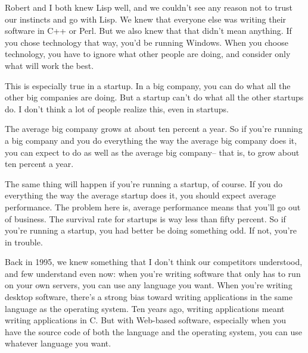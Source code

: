 Robert and I both
                  knew Lisp well, and we couldn't see any reason not to trust
                  our instincts and go with Lisp. We knew that everyone else was
                  writing their software in C++ or Perl. But we also knew that
                  that didn't mean anything. If you chose technology that way,
                  you'd be running Windows. When you choose technology, you have
                  to ignore what other people are doing, and consider only what
                  will work the best.

This is especially true in a
                  startup. In a big company, you can do what all the other big
                  companies are doing. But a startup can't do what all the other
                  startups do. I don't think a lot of people realize this, even
                  in startups.

The average big company grows at about
                  ten percent a year. So if you're running a big company and you
                  do everything the way the average big company does it, you can
                  expect to do as well as the average big company-- that is, to
                  grow about ten percent a year.

The same thing will
                  happen if you're running a startup, of course. If you do
                  everything the way the average startup does it, you should
                  expect average performance. The problem here is, average
                  performance means that you'll go out of business. The survival
                  rate for startups is way less than fifty percent. So if you're
                  running a startup, you had better be doing something odd. If
                  not, you're in trouble.

Back in 1995, we knew
                  something that I don't think our competitors understood, and
                  few understand even now: when you're writing software that
                  only has to run on your own servers, you can use any language
                  you want. When you're writing desktop software, there's a
                  strong bias toward writing applications in the same language
                  as the operating system. Ten years ago, writing applications
                  meant writing applications in C. But with Web-based software,
                  especially when you have the source code of both the language
                  and the operating system, you can use whatever language you
                  want.

